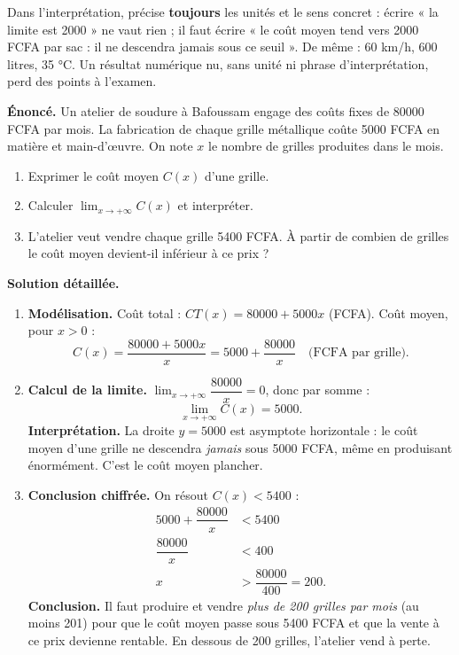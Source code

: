 \documentclass[11pt]{article}
\newcommand{\cle}[1]{{\popxbold\color{popdark}#1}}
\begin{document}
\begin{attention}
Dans l'interprétation, précise \textbf{toujours} les unités et le sens concret : écrire « la limite est 2000 » ne vaut rien ; il faut écrire « le coût moyen tend vers \num{2000} FCFA par sac : il ne descendra jamais sous ce seuil ». De même : 60 km/h, 600 litres, 35 °C. Un résultat numérique nu, sans unité ni phrase d'interprétation, perd des points à l'examen.
\end{attention}

\begin{exoresolu}
\textbf{Énoncé.} Un atelier de soudure à Bafoussam engage des coûts fixes de \num{80000} FCFA par mois. La fabrication de chaque grille métallique coûte \num{5000} FCFA en matière et main-d'œuvre. On note $x$ le nombre de grilles produites dans le mois.
\begin{enumerate}
\item Exprimer le coût moyen $C(x)$ d'une grille.
\item Calculer $\displaystyle\lim_{x \to +\infty} C(x)$ et interpréter.
\item L'atelier veut vendre chaque grille \num{5400} FCFA. À partir de combien de grilles le coût moyen devient-il inférieur à ce prix ?
\end{enumerate}
\tcblower
\textbf{Solution détaillée.}
\begin{enumerate}
\item \textbf{Modélisation.} Coût total : $CT(x) = \num{80000} + \num{5000}x$ (FCFA). Coût moyen, pour $x > 0$ :
\[ C(x) = \dfrac{\num{80000} + \num{5000}x}{x} = \num{5000} + \dfrac{\num{80000}}{x} \quad \text{(FCFA par grille)}. \]
\item \textbf{Calcul de la limite.} $\displaystyle\lim_{x \to +\infty} \dfrac{\num{80000}}{x} = 0$, donc par somme :
\[ \lim_{x \to +\infty} C(x) = \num{5000}. \]
\textbf{Interprétation.} La droite $y = \num{5000}$ est asymptote horizontale : le coût moyen d'une grille ne descendra \emph{jamais} sous \num{5000} FCFA, même en produisant énormément. C'est le \cle{coût moyen plancher}.
\item \textbf{Conclusion chiffrée.} On résout $C(x) < \num{5400}$ :
\begin{align*}
\num{5000} + \dfrac{\num{80000}}{x} &< \num{5400} \\
\dfrac{\num{80000}}{x} &< 400 \\
x &> \dfrac{\num{80000}}{400} = 200.
\end{align*}
\textbf{Conclusion.} Il faut produire et vendre \emph{plus de 200 grilles par mois} (au moins 201) pour que le coût moyen passe sous \num{5400} FCFA et que la vente à ce prix devienne rentable. En dessous de 200 grilles, l'atelier vend à perte.
\end{enumerate}
\end{exoresolu}
\end{document}
